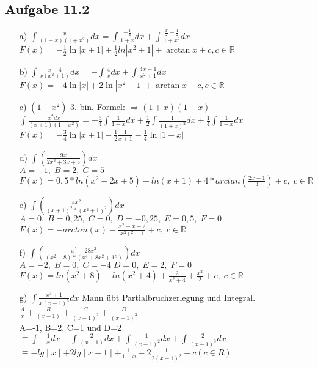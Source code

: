 \documentclass{standalone}
\begin{document}
\subsection{Aufgabe 11.2}
\begin{itemize}
	\item[a)] 
		$\int \frac{x}{(1+x) (1+x^2)} dx= \int \frac{-\frac{1}{2}}{1+x} dx+ \int \frac{\frac{x}{2} + \frac{1}{2}}{1+x^2}dx$ \\
		$F(x) = - \frac{1}{2} \ln|x + 1| + \frac{1}{2} ln|x^2 + 1| + \arctan x + c, c \in \mathbb{R}$ 
	\item[b)]
		$\int \frac{x-4}{x(x^2 + 1)} dx = - \int \frac{4}{x} dx+ \int \frac{4x+1}{x^2 +1} dx$ \\
		$ F(x) = -4 \ln|x| + 2 \ln|x^2 + 1| + \arctan x + c, c \in \mathbb{R} $
	\item[c)]
		$(1-x^2)$ 3. bin. Formel: $ \Rightarrow (1+x) (1-x)$ \\
		$\int \frac{x^2 dx}{(x+1)(1-x^2)} = -\frac{3}{4} \int \frac{1}{1+x}dx + \frac{1}{2} \int \frac{1}{(1+x)^2} dx + \frac{1}{4} \int \frac{1}{1-x} dx$ \\
		$F(x) = -\frac{3}{4} \ln |x+1| -\frac{1}{2} \frac{1}{x+1} - \frac{1}{4} \ln |1-x|$
		
	\item[d)]$\int \left(\frac{9x}{2x^3+3x+5}\right) dx$\\
	$A=-1, \; B=2, \; C=5$\\
	$F(x) =0,5*ln(x^2-2x+5)-ln(x+1)+4*arctan\left(\frac{2x-1}{3}\right)+c, \; c \in \mathbb{R}$
	
	\item[e)]$\int \left(\frac{4x^2}{(x+1)^2*(x^2+1)^2}\right) dx$\\
	$A=0, \; B=0,25, \; C=0, \; D=-0,25, \; E=0,5, \; F=0$\\
	$F(x) =-arctan(x)-\frac{x^2+x+2}{x^3+^2+1}+c, \; c \in \mathbb{R}$
	
	\item[f)]$\int \left(\frac{x^7-28x^3}{(x^2-8)*(x^4+8x^2+16)}\right) dx$\\
	$A=-2, \; B=0, \; C=-4 \; D=0, \; E=2, \; F=0$\\
	$F(x) =ln( x^2+8 )-ln(x^2+4)+\frac{2}{x^2+4}+\frac{x^2}{2}+c, \; c \in \mathbb{R}$
	
	\item[g)]$\int \frac{x^3+1}{x(x-1)^3} dx$ Mann übt Partialbruchzerlegung und Integral.\\
			$\frac{A}{x}+\frac{B}{(x-1)}+\frac{C}{(x-1)^2}+\frac{D}{(x-1)^3}$\\
			A=-1, B=2, C=1 und D=2\\
			$\equiv \int-\frac{1}{x}dx+\int\frac{2}{(x-1)}dx+\int\frac{1}{(x-1)^2}dx+\int\frac{2}{(x-1)^3}dx$
			$\equiv -lg\mid x\mid +2lg\mid x-1\mid+\frac{1}{1-x}-2\frac{1}{2(x+1)^2}+c (c \in R)$\\


\end{itemize}
\end{document}
